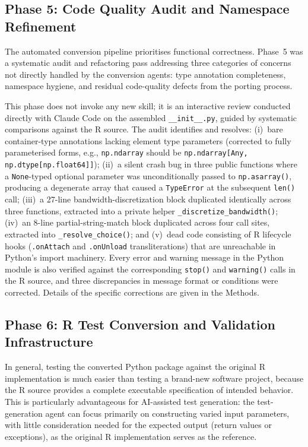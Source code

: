 \documentclass[12pt,a4paper]{article}
\begin{document}
\subsection{Phase 5: Code Quality Audit and Namespace Refinement}
\label{sec:phase5}

The automated conversion pipeline prioritises functional correctness. Phase~5 was a systematic audit and refactoring pass addressing three categories of concerns not directly handled by the conversion agents: type annotation completeness, namespace hygiene, and residual code-quality defects from the porting process.

This phase does not invoke any new skill; it is an interactive review conducted directly with Claude Code on the assembled \texttt{\_\_init\_\_.py}, guided by systematic comparisons against the R source. The audit identifies and resolves: (i)~bare container-type annotations lacking element type parameters (corrected to fully parameterised forms, e.g., \texttt{np.ndarray} should be \texttt{np.ndarray[Any, np.dtype[np.float64]]}); (ii)~a silent crash bug in three public functions where a \texttt{None}-typed optional parameter was unconditionally passed to \texttt{np.asarray()}, producing a degenerate array that caused a \texttt{TypeError} at the subsequent \texttt{len()} call; (iii)~a 27-line bandwidth-discretization block duplicated identically across three functions, extracted into a private helper \texttt{\_discretize\_bandwidth()}; (iv)~an 8-line partial-string-match block duplicated across four call sites, extracted into \texttt{\_resolve\_choice()}; and (v)~dead code consisting of R lifecycle hooks (\texttt{.onAttach} and \texttt{.onUnload} transliterations) that are unreachable in Python's import machinery. Every error and warning message in the Python module is also verified against the corresponding \texttt{stop()} and \texttt{warning()} calls in the R source, and three discrepancies in message format or conditions were corrected. Details of the specific corrections are given in the Methods.

\subsection{Phase 6: R Test Conversion and Validation Infrastructure}
\label{sec:phase6}

In general, testing the converted Python package against the original R implementation is much easier than testing a brand-new software project, because the R source provides a complete executable specification of intended behavior. This is particularly advantageous for AI-assisted test generation: the test-generation agent can focus primarily on constructing varied input parameters, with little consideration needed for the expected output (return values or exceptions), as the original R implementation serves as the reference.
\end{document}
